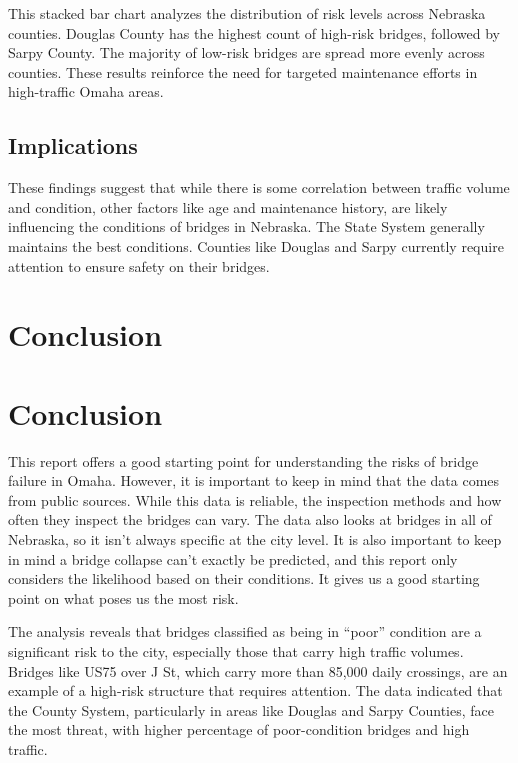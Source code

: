 \documentclass[
  letterpaper,
  DIV=11,
  numbers=noendperiod]{scrreprt}
\begin{document}
This stacked bar chart analyzes the distribution of risk levels across
Nebraska counties. Douglas County has the highest count of high-risk
bridges, followed by Sarpy County. The majority of low-risk bridges are
spread more evenly across counties. These results reinforce the need for
targeted maintenance efforts in high-traffic Omaha areas.

\section{Implications}\label{implications}

These findings suggest that while there is some correlation between
traffic volume and condition, other factors like age and maintenance
history, are likely influencing the conditions of bridges in Nebraska.
The State System generally maintains the best conditions. Counties like
Douglas and Sarpy currently require attention to ensure safety on their
bridges.


\chapter{Conclusion}\label{conclusion-1}


\chapter{Conclusion}\label{conclusion-2}

This report offers a good starting point for understanding the risks of
bridge failure in Omaha. However, it is important to keep in mind that
the data comes from public sources. While this data is reliable, the
inspection methods and how often they inspect the bridges can vary. The
data also looks at bridges in all of Nebraska, so it isn't always
specific at the city level. It is also important to keep in mind a
bridge collapse can't exactly be predicted, and this report only
considers the likelihood based on their conditions. It gives us a good
starting point on what poses us the most risk.

The analysis reveals that bridges classified as being in ``poor''
condition are a significant risk to the city, especially those that
carry high traffic volumes. Bridges like US75 over J St, which carry
more than 85,000 daily crossings, are an example of a high-risk
structure that requires attention. The data indicated that the County
System, particularly in areas like Douglas and Sarpy Counties, face the
most threat, with higher percentage of poor-condition bridges and high
traffic.
\end{document}

